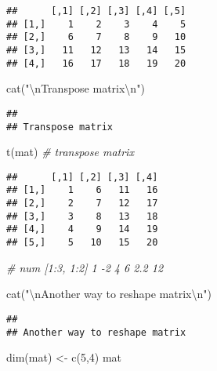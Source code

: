 \documentclass[
]{article}
\newenvironment{Shaded}{\begin{snugshade}}{\end{snugshade}}
\newcommand{\CommentTok}[1]{\textcolor[rgb]{0.56,0.35,0.01}{\textit{#1}}}
\newcommand{\DecValTok}[1]{\textcolor[rgb]{0.00,0.00,0.81}{#1}}
\newcommand{\FunctionTok}[1]{\textcolor[rgb]{0.00,0.00,0.00}{#1}}
\newcommand{\NormalTok}[1]{#1}
\newcommand{\OtherTok}[1]{\textcolor[rgb]{0.56,0.35,0.01}{#1}}
\newcommand{\SpecialCharTok}[1]{\textcolor[rgb]{0.00,0.00,0.00}{#1}}
\newcommand{\StringTok}[1]{\textcolor[rgb]{0.31,0.60,0.02}{#1}}
\begin{document}
\begin{verbatim}
##      [,1] [,2] [,3] [,4] [,5]
## [1,]    1    2    3    4    5
## [2,]    6    7    8    9   10
## [3,]   11   12   13   14   15
## [4,]   16   17   18   19   20
\end{verbatim}

\begin{Shaded}
\begin{Highlighting}[]
\FunctionTok{cat}\NormalTok{(}\StringTok{"}\SpecialCharTok{\textbackslash{}n}\StringTok{Transpose matrix}\SpecialCharTok{\textbackslash{}n}\StringTok{"}\NormalTok{)}
\end{Highlighting}
\end{Shaded}

\begin{verbatim}
## 
## Transpose matrix
\end{verbatim}

\begin{Shaded}
\begin{Highlighting}[]
\FunctionTok{t}\NormalTok{(mat)    }\CommentTok{\# transpose matrix}
\end{Highlighting}
\end{Shaded}

\begin{verbatim}
##      [,1] [,2] [,3] [,4]
## [1,]    1    6   11   16
## [2,]    2    7   12   17
## [3,]    3    8   13   18
## [4,]    4    9   14   19
## [5,]    5   10   15   20
\end{verbatim}

\begin{Shaded}
\begin{Highlighting}[]
\CommentTok{\# num [1:3, 1:2] 1 {-}2 4 6 2.2 12}

\FunctionTok{cat}\NormalTok{(}\StringTok{"}\SpecialCharTok{\textbackslash{}n}\StringTok{Another way to reshape matrix}\SpecialCharTok{\textbackslash{}n}\StringTok{"}\NormalTok{)}
\end{Highlighting}
\end{Shaded}

\begin{verbatim}
## 
## Another way to reshape matrix
\end{verbatim}

\begin{Shaded}
\begin{Highlighting}[]
\FunctionTok{dim}\NormalTok{(mat) }\OtherTok{\textless{}{-}} \FunctionTok{c}\NormalTok{(}\DecValTok{5}\NormalTok{,}\DecValTok{4}\NormalTok{)}
\NormalTok{mat}
\end{Highlighting}
\end{Shaded}
\end{document}
